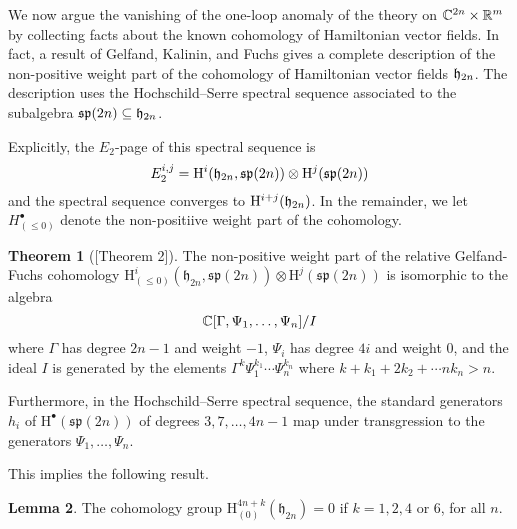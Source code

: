 \documentclass[11pt, oneside, reqno]{amsart}
\theoremstyle{definition} \newtheorem{definition}{Definition}[section]
\newtheorem{lemma}[definition]{Lemma}
\newtheorem{theorem}[definition]{Theorem}
\theoremstyle{definition}
\theoremstyle{remark}
\theoremstyle{definition} \newtheorem{remark}[definition]{Remark}
\theoremstyle{definition} \newtheorem{remarks}[definition]{Remarks}
\theoremstyle{definition} \newtheorem{question}[definition]{Question}
\theoremstyle{definition} \newtheorem*{note}{Note}
\theoremstyle{definition} \newtheorem{example}[definition]{Example}
\theoremstyle{definition} \newtheorem{examples}[definition]{Examples}
\def\bu{\bullet}
\renewcommand{\sp}{\mathfrak{sp}}
\newcommand{\sub}{\subseteq}
\newcommand{\mr}[1]{\mathrm{#1}}
\newcommand{\mf}[1]{\mathfrak{#1}}
\newcommand{\ham}{/\!\!/}
\def\ham{\fh}
\begin{document}
We now argue the vanishing of the one-loop anomaly of the theory on $\mathbb C^{2n} \times \mathbb R^m$ by collecting facts about the known cohomology of Hamiltonian vector fields.
In fact, a result of Gelfand, Kalinin, and Fuchs \cite{GKF} gives a complete description of the non-positive weight part of the cohomology of Hamiltonian vector fields $\ham_{2n}$.  
The description uses the Hochschild--Serre spectral sequence associated to the subalgebra $\sp(2n) \sub \ham_{2n}$.

Explicitly, the $E_2$-page of this spectral sequence is
\[
E_2^{i,j} = \mr H^i(\fh_{2n}, \sp(2n)) \otimes \mr H^j(\sp(2n))
\]
and the spectral sequence converges to $\mr H^{i+j}(\fh_{2n})$.  
In the remainder, we let $H^\bu_{(\leq 0)}$ denote the non-positiive weight part of the cohomology. 

\begin{theorem}[{\cite{GKF}[Theorem 2]}]
The non-positive weight part of the relative Gelfand-Fuchs cohomology $\mr H^i_{(\le 0)}(\mf{h}_{2n}, \sp(2n)) \otimes \mr H^j(\sp(2n))$ is isomorphic to the algebra
\[\mathbb C[\Gamma, \Psi_1, \ldots, \Psi_n]/I\]
where $\Gamma$ has degree $2n-1$ and weight $-1$, $\Psi_i$ has degree $4i$ and weight $0$, and the ideal $I$ is generated by the elements $\Gamma^k\Psi_1^{k_1} \cdots \Psi_n^{k_n}$ where $k + k_1 + 2k_2 + \cdots nk_n > n$.  

Furthermore, in the Hochschild--Serre spectral sequence, the standard generators $h_i$ of $\mr H^\bullet(\sp(2n))$ of degrees $3, 7, \ldots, 4n-1$ map under transgression to the generators $\Psi_1, \ldots, \Psi_n$.
\end{theorem}

This implies the following result.
\begin{lemma} \label{ham_cohomology_lemma}
The cohomology group $\mr H^{4n+k}_{(0)}(\mf{h}_{2n}) = 0$ if $k = 1,2, 4$ or $6$, for all $n$.  
\end{lemma}
\end{document}
